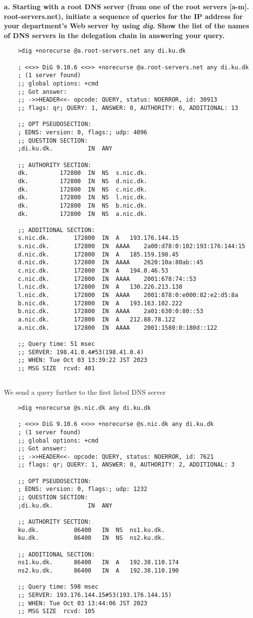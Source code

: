 \textbf{a. Starting with a root DNS server (from one of the root servers [a-m]. root-servers.net), initiate a sequence of queries for the IP address for your department's Web server by using \textit{dig}. Show the list of the names of DNS
servers in the delegation chain in answering your query.} \\
\begin{verbatim}
    >dig +norecurse @a.root-servers.net any di.ku.dk

    ; <<>> DiG 9.10.6 <<>> +norecurse @a.root-servers.net any di.ku.dk
    ; (1 server found)
    ;; global options: +cmd
    ;; Got answer:
    ;; ->>HEADER<<- opcode: QUERY, status: NOERROR, id: 30913
    ;; flags: qr; QUERY: 1, ANSWER: 0, AUTHORITY: 6, ADDITIONAL: 13
    
    ;; OPT PSEUDOSECTION:
    ; EDNS: version: 0, flags:; udp: 4096
    ;; QUESTION SECTION:
    ;di.ku.dk.			IN	ANY
    
    ;; AUTHORITY SECTION:
    dk.			172800	IN	NS	s.nic.dk.
    dk.			172800	IN	NS	d.nic.dk.
    dk.			172800	IN	NS	c.nic.dk.
    dk.			172800	IN	NS	l.nic.dk.
    dk.			172800	IN	NS	b.nic.dk.
    dk.			172800	IN	NS	a.nic.dk.
    
    ;; ADDITIONAL SECTION:
    s.nic.dk.		172800	IN	A	193.176.144.15
    s.nic.dk.		172800	IN	AAAA	2a00:d78:0:102:193:176:144:15
    d.nic.dk.		172800	IN	A	185.159.198.45
    d.nic.dk.		172800	IN	AAAA	2620:10a:80ab::45
    c.nic.dk.		172800	IN	A	194.0.46.53
    c.nic.dk.		172800	IN	AAAA	2001:678:74::53
    l.nic.dk.		172800	IN	A	130.226.213.138
    l.nic.dk.		172800	IN	AAAA	2001:878:0:e000:82:e2:d5:8a
    b.nic.dk.		172800	IN	A	193.163.102.222
    b.nic.dk.		172800	IN	AAAA	2a01:630:0:80::53
    a.nic.dk.		172800	IN	A	212.88.78.122
    a.nic.dk.		172800	IN	AAAA	2001:1580:0:180d::122
    
    ;; Query time: 51 msec
    ;; SERVER: 198.41.0.4#53(198.41.0.4)
    ;; WHEN: Tue Oct 03 13:39:22 JST 2023
    ;; MSG SIZE  rcvd: 401
    
\end{verbatim}
We send a query further to the first listed DNS server
\begin{verbatim}
    >dig +norecurse @s.nic.dk any di.ku.dk          

    ; <<>> DiG 9.10.6 <<>> +norecurse @s.nic.dk any di.ku.dk
    ; (1 server found)
    ;; global options: +cmd
    ;; Got answer:
    ;; ->>HEADER<<- opcode: QUERY, status: NOERROR, id: 7621
    ;; flags: qr; QUERY: 1, ANSWER: 0, AUTHORITY: 2, ADDITIONAL: 3
    
    ;; OPT PSEUDOSECTION:
    ; EDNS: version: 0, flags:; udp: 1232
    ;; QUESTION SECTION:
    ;di.ku.dk.			IN	ANY
    
    ;; AUTHORITY SECTION:
    ku.dk.			86400	IN	NS	ns1.ku.dk.
    ku.dk.			86400	IN	NS	ns2.ku.dk.
    
    ;; ADDITIONAL SECTION:
    ns1.ku.dk.		86400	IN	A	192.38.110.174
    ns2.ku.dk.		86400	IN	A	192.38.110.190
    
    ;; Query time: 598 msec
    ;; SERVER: 193.176.144.15#53(193.176.144.15)
    ;; WHEN: Tue Oct 03 13:44:06 JST 2023
    ;; MSG SIZE  rcvd: 105
\end{verbatim}
